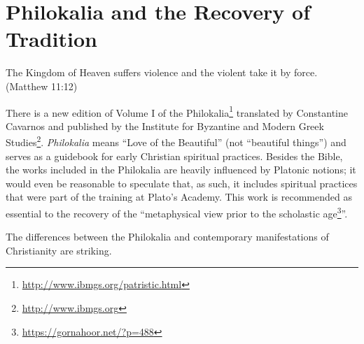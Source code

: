 \section{Philokalia and the Recovery of Tradition}

\begin{quotex}
The Kingdom of Heaven suffers violence and the violent take it by force. (Matthew 11:12)
\end{quotex}


There is a new edition of Volume I of the Philokalia\footnote{\url{http://www.ibmgs.org/patristic.html}} translated by Constantine Cavarnos and published by the Institute for Byzantine and Modern Greek Studies\footnote{\url{http://www.ibmgs.org}}. \emph{Philokalia} means ``Love of the Beautiful'' (not ``beautiful things'') and serves as a guidebook for early Christian spiritual practices. Besides the Bible, the works included in the Philokalia are heavily influenced by Platonic notions; it would even be reasonable to speculate that, as such, it includes spiritual practices that were part of the training at Plato's Academy. This work is recommended as essential to the recovery of the ``metaphysical view prior to the scholastic age\footnote{\url{https://gornahoor.net/?p=488}}''.

The differences between the Philokalia and contemporary manifestations of Christianity are striking.

